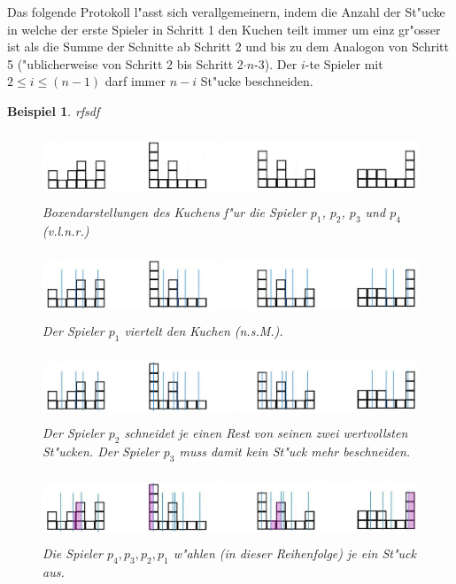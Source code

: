\documentclass[11pt, a4paper, twoside]{article}
\newcommand{\wf}{\color{white}}
\newtheorem{bsp}[satz]{Beispiel}
\numberwithin{equation}{section}
\begin{document}
\newline
\newline
Das folgende Protokoll l"asst sich verallgemeinern, indem die Anzahl der St"ucke in welche der erste Spieler in Schritt 1 den Kuchen teilt immer um einz gr"osser ist als die Summe der Schnitte ab Schritt 2 und bis zu dem Analogon von Schritt 5 ("ublicherweise von Schritt 2 bis Schritt 2$\cdot n$-3). Der $i$-te Spieler mit $2 \leq i \leq (n-1)$ darf immer $n-i$ St"ucke beschneiden.
\begin{bsp}\wf rfsdf
\begin{figure}[h!]
\includegraphics[height=2cm]{upfv.jpg}
\caption[Beispiel zum unendlichen Protokoll 1/4]{Boxendarstellungen des Kuchens f"ur die Spieler $p_1$, $p_2$, $p_3$ und $p_4$ (v.l.n.r.)}
\end{figure}
\begin{figure}[h!]
\includegraphics[height=2cm]{upfv2.jpg}
\caption[Beispiel zum unendlichen Protokoll 2/4]{Der Spieler $p_1$ viertelt den Kuchen (n.s.M.).}
\end{figure}
\begin{figure}[h!]
\includegraphics[height=2cm]{upfv3.jpg}
\caption[Beispiel zum unendlichen Protokoll 3/4]{Der Spieler $p_2$ schneidet je einen Rest von seinen zwei wertvollsten St"ucken. Der Spieler $p_3$ muss damit kein St"uck mehr beschneiden.}
\end{figure}
\begin{figure}[h!]
\includegraphics[height=2cm]{upfv5.jpg}
\caption[Beispiel zum unendlichen Protokoll 4/4]{Die Spieler $p_4,p_3,p_2,p_1$ w"ahlen (in dieser Reihenfolge) je ein St"uck aus.}
\end{figure}
\end{bsp}\newpage
\end{document}
